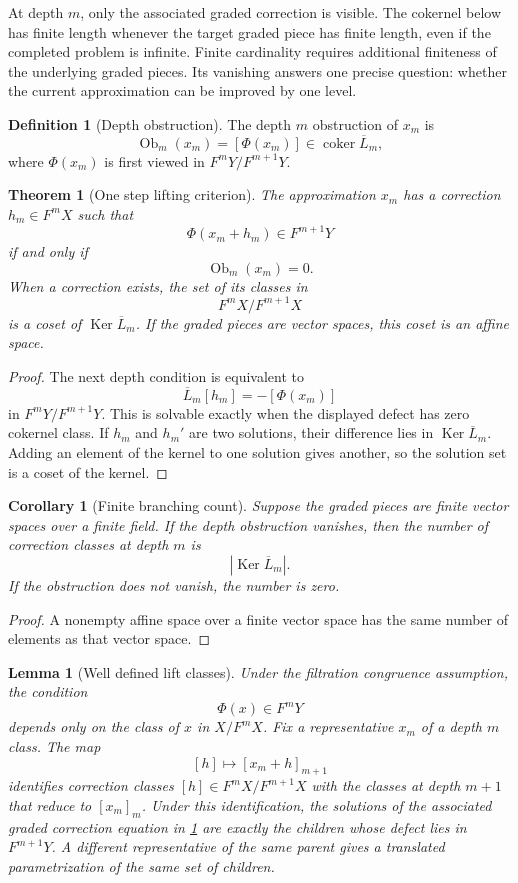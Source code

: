 \documentclass[11pt,a4paper]{article}
\newtheorem{theorem}{Theorem}[section]
\theoremstyle{plain}
\newtheorem{lemma}[lemma]{Lemma}
\newtheorem{corollary}[corollary]{Corollary}
\theoremstyle{definition}
\newtheorem{definition}[definition]{Definition}
\theoremstyle{remark}
\newcommand{\Ob}{\operatorname{Ob}}
\newcommand{\Ker}{\operatorname{Ker}}
\newcommand{\coker}{\operatorname{coker}}
\begin{document}
At depth $m$, only the associated graded correction is visible.  The cokernel below has finite length whenever the target graded piece has finite length, even if the completed problem is infinite. Finite cardinality requires additional finiteness of the underlying graded pieces.  Its vanishing answers one precise question: whether the current approximation can be improved by one level.

\begin{definition}[Depth obstruction]\label{def:depth_obstruction}
The depth $m$ obstruction of $x_m$ is
\[
\Ob_m(x_m)
=
[\Phi(x_m)]
\in
\coker\overline L_m,
\]
where $\Phi(x_m)$ is first viewed in $F^mY/F^{m+1}Y$.
\end{definition}

\begin{theorem}[One step lifting criterion]\label{thm:one_step_lifting}
The approximation $x_m$ has a correction $h_m\in F^mX$ such that
\[
\Phi(x_m+h_m)\in F^{m+1}Y
\]
if and only if
\[
\Ob_m(x_m)=0.
\]
When a correction exists, the set of its classes in
\[
F^mX/F^{m+1}X
\]
is a coset of $\Ker\overline L_m$.  If the graded pieces are vector spaces, this coset is an affine space.
\end{theorem}

\begin{proof}
The next depth condition is equivalent to
\[
\overline L_m[h_m]
=-[\Phi(x_m)]
\]
in $F^mY/F^{m+1}Y$.  This is solvable exactly when the displayed defect has zero cokernel class.  If $h_m$ and $h_m'$ are two solutions, their difference lies in $\Ker\overline L_m$.  Adding an element of the kernel to one solution gives another, so the solution set is a coset of the kernel.
\end{proof}

\begin{corollary}[Finite branching count]\label{cor:finite_branch_count}
Suppose the graded pieces are finite vector spaces over a finite field.  If the depth obstruction vanishes, then the number of correction classes at depth $m$ is
\[
|\Ker\overline L_m|.
\]
If the obstruction does not vanish, the number is zero.
\end{corollary}

\begin{proof}
A nonempty affine space over a finite vector space has the same number of elements as that vector space.
\end{proof}


\begin{lemma}[Well defined lift classes]\label{lem:well_defined_lift_classes}
Under the filtration congruence assumption, the condition
\[
\Phi(x)\in F^mY
\]
depends only on the class of $x$ in $X/F^mX$.  Fix a representative $x_m$ of a depth $m$ class.  The map
\[
[h]\longmapsto[x_m+h]_{m+1}
\]
identifies correction classes $[h]\in F^mX/F^{m+1}X$ with the classes at depth $m+1$ that reduce to $[x_m]_m$.  Under this identification, the solutions of the associated graded correction equation in \cref{thm:one_step_lifting} are exactly the children whose defect lies in $F^{m+1}Y$.  A different representative of the same parent gives a translated parametrization of the same set of children.
\end{lemma}
\end{document}
